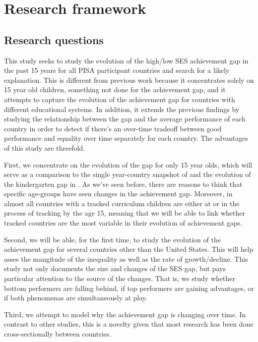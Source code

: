 \documentclass[11pt, a4paper]{article}\usepackage[]{graphicx}\usepackage[]{color}
\begin{document}
\section{Research framework}

\subsection{Research questions}

This study seeks to study the evolution of the high/low SES achievement gap in the past 15 years for all PISA participant countries and search for a likely explanation. This is different from previous work because it concentrates solely on 15 year old children, something not done for the achievement gap, and it attempts to capture the evolution of the achievement gap for countries with different educational systems. In addition, it extends the previous findings by studying the relationship between the gap and the average performance of each country in order to detect if there's an over-time tradeoff between good performance and equality over time separately for each country. The advantages of this study are threefold.

First, we concentrate on the evolution of the gap for only 15 year olds, which will serve as a comparison to the single year-country snapshot of \citet{anna2016} and the evolution of the kindergarten gap in \citet{reardon_portilla}. As we've seen before, there are reasons to think that specific age-groups have seen changes in the achievement gap. Moreover, in almost all countries with a tracked curriculum children are either at or in the process of tracking by the age 15, meaning that we will be able to link whether tracked countries are the most variable in their evolution of achievement gaps.

Second, we will be able, for the first time, to study the evolution of the achievement gap for several countries other than the United States. This will help asses the mangitude of the inequality as well as the rate of growth/decline. This study not only documents the size and changes of the SES gap, but pays particular attention to the source of the changes. That is, we study whether bottom performers are falling behind, if top performers are gaining advantages, or if both phenomenas are simultaneously at play.

Third, we attempt to model why the achievement gap is changing over time. In contrast to other studies, this is a novelty given that most research has been done cross-sectionally between countries.
\end{document}
